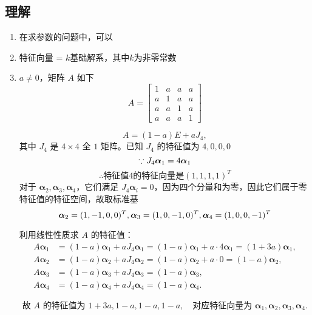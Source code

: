\documentclass[a4paper,12pt]{article}
\begin{document}
    \subsection{理解}

    \begin{enumerate}
        \item 在求参数的问题中，可以{\color[rgb]{0.2, 0.6, 0.3}{由特征向量可构造方程组}}
        \item 特征向量 = $k$基础解系，其中$k$为非零常数
        \item $a \neq 0$，矩阵 $A$ 如下
        \[
            A =
            \begin{bmatrix}
                1 & a & a & a \\
                a & 1 & a & a \\
                a & a & 1 & a \\
                a & a & a & 1
            \end{bmatrix}

        \]
        \begin{analysisbox}
            \[
                A = (1-a)E + a J_4,
            \]
            其中 $J_4$ 是 $4 \times 4$ 全 $1$ 矩阵。已知 $J_4$ 的特征值为 $4,0,0,0$
            \[
                \because J_4 \bm{\alpha}_1 = 4 \bm{\alpha}_1 \\
            \]
            \[
                \therefore \text{特征值}4\text{的特征向量是}(1,1,1,1)^T
            \]
            对于 $\bm{\alpha}_2, \bm{\alpha}_3, \bm{\alpha}_4$，它们满足 $J_4 \bm{\alpha}_i = 0$，因为四个分量和为零，因此它们属于零特征值的特征空间，故取标准基
            \[
                \bm{\alpha}_2 = (1,-1,0,0)^T, \\
                \bm{\alpha}_3 = (1,0,-1,0)^T, \\
                \bm{\alpha}_4 = (1,0,0,-1)^T
            \]

            利用线性性质求 $A$ 的特征值：
            \[
                \begin{aligned}
                    A \bm{\alpha}_1 &= (1-a) \bm{\alpha}_1 + a J_4 \bm{\alpha}_1 = (1-a)\bm{\alpha}_1 + a \cdot 4 \bm{\alpha}_1 = (1+3a) \bm{\alpha}_1, \\
                    A \bm{\alpha}_2 &= (1-a)\bm{\alpha}_2 + a J_4 \bm{\alpha}_2 = (1-a)\bm{\alpha}_2 + a \cdot 0 = (1-a)\bm{\alpha}_2, \\
                    A \bm{\alpha}_3 &= (1-a)\bm{\alpha}_3 + a J_4 \bm{\alpha}_3 = (1-a)\bm{\alpha}_3, \\
                    A \bm{\alpha}_4 &= (1-a)\bm{\alpha}_4 + a J_4 \bm{\alpha}_4 = (1-a)\bm{\alpha}_4.
                \end{aligned}
            \]

            \[
                \text{故 $A$ 的特征值为 } 1+3a, 1-a, 1-a, 1-a, \quad \text{对应特征向量为 } \bm{\alpha}_1, \bm{\alpha}_2, \bm{\alpha}_3, \bm{\alpha}_4.
            \]
        \end{analysisbox}
    \end{enumerate}
\end{document}
